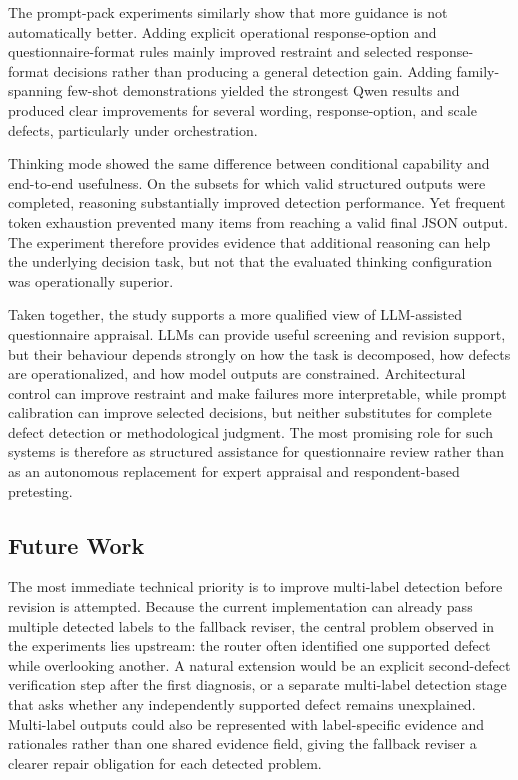 \documentclass[11pt,a4paper]{article}
\begin{document}
The prompt-pack experiments similarly show that more guidance is not
automatically better. Adding explicit operational response-option and
questionnaire-format rules mainly improved restraint and selected response-format
decisions rather than producing a general detection gain. Adding family-spanning
few-shot demonstrations yielded the strongest Qwen results and produced clear
improvements for several wording, response-option, and scale defects, particularly
under orchestration. 


Thinking mode showed the same difference between conditional capability and
end-to-end usefulness. On the subsets for which valid structured outputs were
completed, reasoning substantially improved detection performance. Yet frequent
token exhaustion prevented many items from reaching a valid final JSON output.
The experiment therefore provides evidence that additional reasoning can help
the underlying decision task, but not that the evaluated thinking configuration
was operationally superior.

Taken together, the study supports a more qualified view of LLM-assisted
questionnaire appraisal. LLMs can provide useful screening and revision support,
but their behaviour depends strongly on how the task is decomposed, how defects
are operationalized, and how model outputs are constrained. Architectural
control can improve restraint and make failures more interpretable, while
prompt calibration can improve selected decisions, but neither substitutes for
complete defect detection or methodological judgment. The most promising role
for such systems is therefore as structured assistance for questionnaire review
rather than as an autonomous replacement for expert appraisal and respondent-based
pretesting.


\subsection{Future Work}
\label{subsec:future-work}

The most immediate technical priority is to improve multi-label detection before
revision is attempted. Because the current implementation can already pass
multiple detected labels to the fallback reviser, the central problem observed
in the experiments lies upstream: the router often identified one supported
defect while overlooking another. A natural extension would be an explicit
second-defect verification step after the first diagnosis, or a separate
multi-label detection stage that asks whether any independently supported
defect remains unexplained. Multi-label outputs could also be represented with
label-specific evidence and rationales rather than one shared evidence field,
giving the fallback reviser a clearer repair obligation for each detected
problem.
\end{document}
